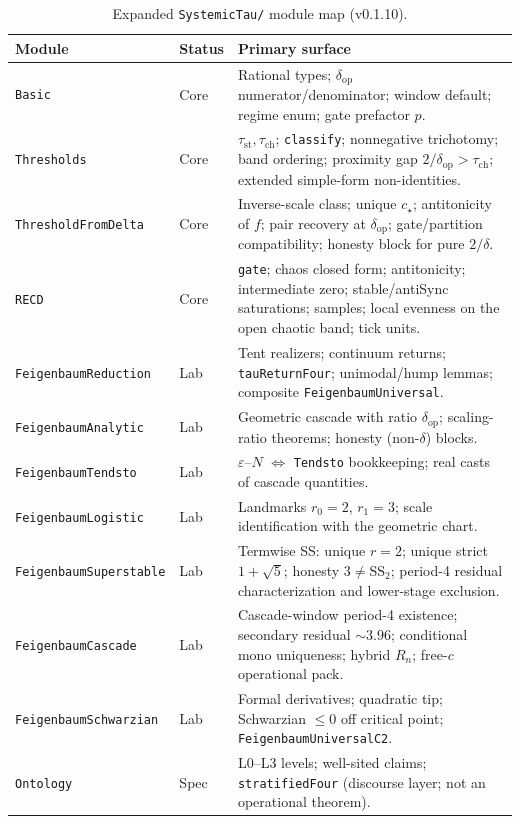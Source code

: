 \documentclass[11pt,a4paper]{article}
\newcommand{\taust}{\tau_{\mathrm{st}}}
\newcommand{\tauch}{\tau_{\mathrm{ch}}}
\newcommand{\deltaop}{\delta_{\mathrm{op}}}
\begin{document}
\begin{table}[H]
\centering
\caption{Expanded \texttt{SystemicTau/} module map (v0.1.10).}
\label{tab:modules-detail}
\begin{tabularx}{\textwidth}{@{}l>{\raggedright\arraybackslash}p{1.4cm}X@{}}
\toprule
\textbf{Module} & \textbf{Status} & \textbf{Primary surface} \\
\midrule
\texttt{Basic} & Core &
  Rational types; \(\deltaop\) numerator/denominator;
  window default; regime enum; gate prefactor \(p\). \\
\texttt{Thresholds} & Core &
  \(\taust,\tauch\); \texttt{classify}; nonnegative trichotomy;
  band ordering; proximity gap \(2/\deltaop>\tauch\);
  extended simple-form non-identities. \\
\texttt{ThresholdFromDelta} & Core &
  Inverse-scale class; unique \(c_\star\); antitonicity of \(f\);
  pair recovery at \(\deltaop\); gate/partition compatibility;
  honesty block for pure \(2/\delta\). \\
\texttt{RECD} & Core &
  \texttt{gate}; chaos closed form; antitonicity;
  intermediate zero; stable/antiSync saturations; samples;
  local evenness on the open chaotic band; tick units. \\
\texttt{FeigenbaumReduction} & Lab &
  Tent realizers; continuum returns; \texttt{tauReturnFour};
  unimodal/hump lemmas; composite \texttt{FeigenbaumUniversal}. \\
\texttt{FeigenbaumAnalytic} & Lab &
  Geometric cascade with ratio \(\deltaop\);
  scaling-ratio theorems; honesty (non-\(\delta\)) blocks. \\
\texttt{FeigenbaumTendsto} & Lab &
  \(\varepsilon\)--\(N\) \(\Leftrightarrow\) \texttt{Tendsto} bookkeeping;
  real casts of cascade quantities. \\
\texttt{FeigenbaumLogistic} & Lab &
  Landmarks \(r_0=2\), \(r_1=3\); scale identification with the geometric chart. \\
\texttt{FeigenbaumSuperstable} & Lab &
  Termwise SS: unique \(r=2\); unique strict \(1+\sqrt5\); honesty \(3\not=\mathrm{SS}_2\);
  period-4 residual characterization and lower-stage exclusion. \\
\texttt{FeigenbaumCascade} & Lab &
  Cascade-window period-4 existence; secondary residual \(\sim 3.96\);
  conditional mono uniqueness; hybrid \(R_n\); free-\(c\) operational pack. \\
\texttt{FeigenbaumSchwarzian} & Lab &
  Formal derivatives; quadratic tip; Schwarzian \(\le 0\) off critical point;
  \texttt{FeigenbaumUniversalC2}. \\
\texttt{Ontology} & Spec &
  L0--L3 levels; well-sited claims; \texttt{stratifiedFour}
  (discourse layer; not an operational theorem). \\
\bottomrule
\end{tabularx}
\end{table}
\end{document}

